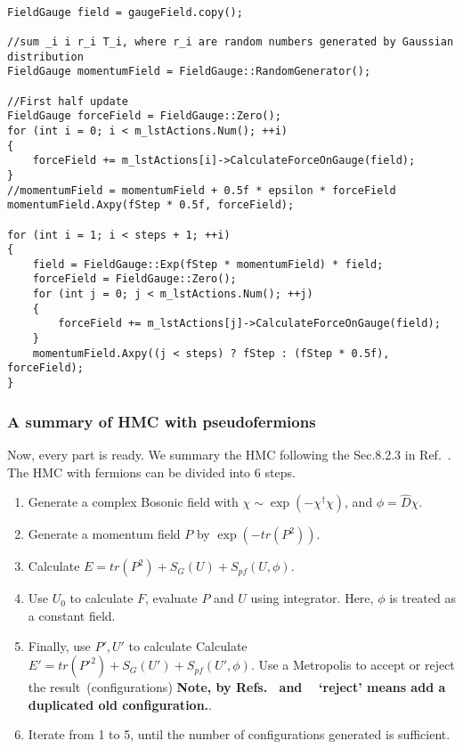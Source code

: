 \begin{lstlisting}

FieldGauge field = gaugeField.copy();

//sum _i i r_i T_i, where r_i are random numbers generated by Gaussian distribution
FieldGauge momentumField = FieldGauge::RandomGenerator();

//First half update
FieldGauge forceField = FieldGauge::Zero();
for (int i = 0; i < m_lstActions.Num(); ++i)
{
    forceField += m_lstActions[i]->CalculateForceOnGauge(field);
}
//momentumField = momentumField + 0.5f * epsilon * forceField
momentumField.Axpy(fStep * 0.5f, forceField);

for (int i = 1; i < steps + 1; ++i)
{
    field = FieldGauge::Exp(fStep * momentumField) * field;
    forceField = FieldGauge::Zero();
    for (int j = 0; j < m_lstActions.Num(); ++j)
    {
        forceField += m_lstActions[j]->CalculateForceOnGauge(field);
    }
    momentumField.Axpy((j < steps) ? fStep : (fStep * 0.5f), forceField);
}

\end{lstlisting}

\subsubsection{\label{summaryOfHMC}A summary of HMC with pseudofermions}

Now, every part is ready. We summary the HMC following the Sec.8.2.3 in Ref.~\cite{latticeqcdbook2010}. The HMC with fermions can be divided into 6 steps.

\begin{enumerate}
  \item Generate a complex Bosonic field with $\chi \sim \exp (-\chi ^{\dagger}\chi)$, and $\phi = \hat{D} \chi$.
  \item Generate a momentum field $P$ by $\exp (-tr(P^2))$.
  \item Calculate $E=tr(P^2)+S_G(U)+S_{pf}(U,\phi)$.
  \item Use $U_0$ to calculate $F$, evaluate $P$ and $U$ using integrator. Here, $\phi$ is treated as a constant field.
  \item Finally, use $P',U'$ to calculate Calculate $E'=tr({P'}^2)+S_G(U')+S_{pf}(U',\phi)$. Use a Metropolis to accept or reject the result~(configurations) \textbf{Note, by Refs.~\cite{latticeqcdbook2010} and ~\cite{latticeqcdreview2009} `reject' means add a duplicated old configuration.}.
  \item Iterate from 1 to 5, until the number of configurations generated is sufficient.
\end{enumerate}

